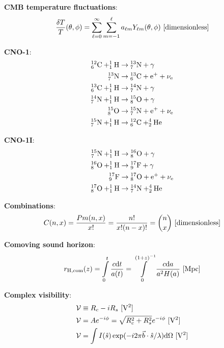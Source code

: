 \documentclass[a4paper,10pt]{article}
\begin{document}
{\noindent}\textbf{CMB temperature fluctuations}:
\begin{align*}
    \frac{\delta T}{T}(\theta,\phi) = \sum\limits_{\ell=0}^{\infty}\sum\limits_{m=-1}^{\ell} a_{\ell m}Y_{\ell m}(\theta,\phi) ~ [{\rm dimensionless}]
\end{align*}

{\noindent}\textbf{CNO-1}:
\begin{align*}
    {\rm ^{12}_6C + ^1_1H} &\rightarrow {\rm ^{13}_7N + \gamma} \\
    {\rm ^{13}_7N} &\rightarrow {\rm ^{13}_6C + e^+ + \nu_e} \\
    {\rm ^{13}_6C + ^1_1H} &\rightarrow {\rm ^{14}_7N + \gamma} \\
    {\rm ^{14}_7N + ^1_1H} &\rightarrow {\rm ^{15}_8O + \gamma} \\
    {\rm ^{15}_8O} &\rightarrow {\rm ^{15}_7N + e^+ + \nu_e} \\
    {\rm ^{15}_7N + ^1_1H} &\rightarrow {\rm ^{12}_6C + ^4_2He}
\end{align*}

{\noindent}\textbf{CNO-1I}:
\begin{align*}
    {\rm ^{15}_7N + ^1_1H} &\rightarrow {\rm ^{16}_8O + \gamma} \\
    {\rm ^{16}_8O + ^1_1H} &\rightarrow {\rm ^{17}_9F +\gamma} \\
    {\rm ^{17}_9F} &\rightarrow {\rm ^{17}_8O + e^+ + \nu_e} \\
    {\rm ^{17}_8O + ^1_1H} &\rightarrow {\rm ^{14}_7N + ^4_2He}
\end{align*}

{\noindent}\textbf{Combinations}:
\begin{align*}
    C(n,x) = \frac{Pm(n,x)}{x!} = \frac{n!}{x!(n-x)!} = \binom{n}{x} ~ [{\rm dimensionless}]
\end{align*}

{\noindent}\textbf{Comoving sound horizon}:
\begin{align*}
    r_\mathrm{H,com}(z) = \int\limits_0^t \frac{c\mathrm{d}t}{a(t)} = \int\limits_0^{(1+z)^{-1}} \frac{c\mathrm{d}a}{a^2H(a)} ~ [{\rm Mpc}]
\end{align*}

{\noindent}\textbf{Complex visibility}:
\begin{align*}
    \mathcal{V} &\equiv R_c - i R_s ~ [{\rm V^2}] \\
    \mathcal{V} &= Ae^{-i\phi} = \sqrt{R_c^2 + R_s^2} e^{-i\phi} ~ [{\rm V^2}] \\
    \mathcal{V} &= \int I(\hat{s}) \exp (-i2\pi\vec{b}\cdot\hat{s}/\lambda){\rm d}\Omega ~ [{\rm V^2}]
\end{align*}
\end{document}
